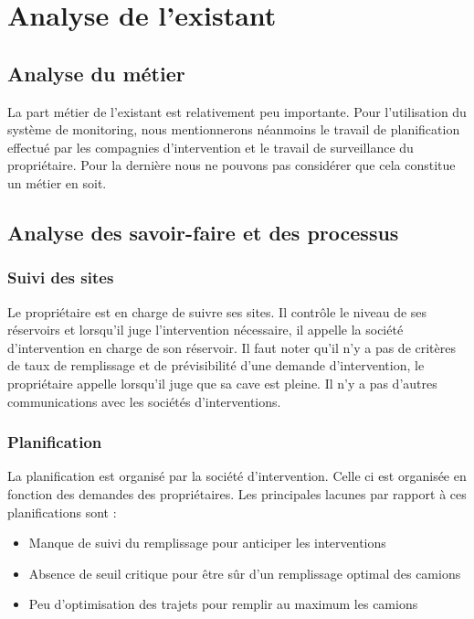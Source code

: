 \section{Analyse de l'existant}

\subsection{Analyse du métier}

La part métier de l'existant est relativement peu importante. Pour l'utilisation du système de monitoring, nous mentionnerons néanmoins le travail de planification effectué par les compagnies d'intervention et le travail de surveillance du propriétaire. Pour la dernière nous ne pouvons pas considérer que cela constitue un métier en soit.

\subsection{Analyse des savoir-faire et des processus}

\subsubsection{Suivi des sites}

Le propriétaire est en charge de suivre ses sites. Il contrôle le niveau de ses réservoirs et lorsqu'il juge l'intervention nécessaire, il appelle la société d'intervention en charge de son réservoir. Il faut noter qu'il n'y a pas de critères de taux de remplissage et de prévisibilité d'une demande d'intervention, le propriétaire appelle lorsqu'il juge que sa cave est pleine.
Il n'y a pas d'autres communications avec les sociétés d'interventions.


\subsubsection{Planification}

La planification est organisé par la société d'intervention. Celle ci est organisée en fonction des demandes des propriétaires. Les principales lacunes par rapport à ces planifications sont : 
\begin{itemize}
\item Manque de suivi du remplissage pour anticiper les interventions
\item Absence de seuil critique pour être sûr d'un remplissage optimal des camions
\item Peu d'optimisation des trajets pour remplir au maximum les camions
\end{itemize}

